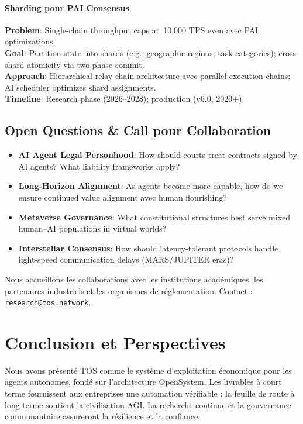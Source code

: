 \documentclass[11pt]{article}
\begin{document}
\paragraph{Sharding pour PAI Consensus}
\textbf{Problem}: Single-chain throughput caps at~10,000 TPS even avec PAI optimizations.\\
\textbf{Goal}: Partition state into shards (e.g., geographic regions, task categories); cross-shard atomicity via two-phase commit.\\
\textbf{Approach}: Hierarchical relay chain architecture avec parallel execution chains; AI scheduler optimizes shard assignments.\\
\textbf{Timeline}: Research phase (2026--2028); production (v6.0, 2029+).

\subsection{Open Questions \& Call pour Collaboration}

\begin{itemize}[noitemsep]
  \item \textbf{AI Agent Legal Personhood}: How should courts treat contracts signed by AI agents? What liability frameworks apply?
  \item \textbf{Long-Horizon Alignment}: As agents become more capable, how do we ensure continued value alignment avec human flourishing?
  \item \textbf{Metaverse Governance}: What constitutional structures best serve mixed human--AI populations in virtual worlds?
  \item \textbf{Interstellar Consensus}: How should latency-tolerant protocols handle light-speed communication delays (MARS/JUPITER eras)?
\end{itemize}

Nous accueillons les collaborations avec les institutions académiques, les partenaires industriels et les organismes de réglementation. Contact : \texttt{research@tos.network}.

\section{Conclusion et Perspectives}
Nous avons présenté TOS comme le système d'exploitation économique pour les agents autonomes, fondé sur l'architecture OpenSystem. Les livrables à court terme fournissent aux entreprises une automation vérifiable ; la feuille de route à long terme soutient la civilisation AGI. La recherche continue et la gouvernance communautaire assureront la résilience et la confiance.
\end{document}
